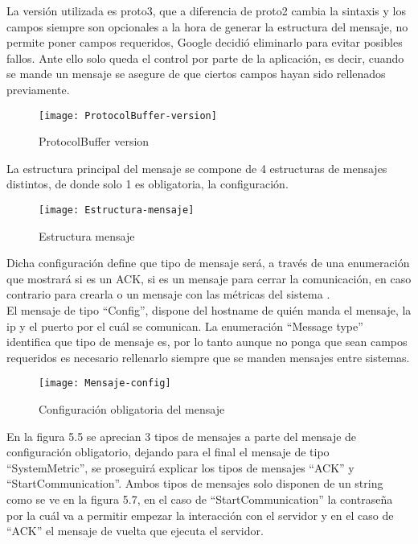 \documentclass[ spanish, a4paper, 12pt, oneside]{report}
\begin{document}
La versión utilizada es proto3, que a diferencia de proto2 cambia la sintaxis y los campos siempre son opcionales a la hora de generar la estructura del mensaje, no permite poner campos requeridos, Google decidió eliminarlo para 
evitar posibles fallos. Ante ello solo queda el control por parte de la aplicación, es decir, cuando se mande un mensaje se asegure de que ciertos campos hayan sido rellenados previamente. \\


\begin{figure}[!h]
   \centering
   \texttt{[image: ProtocolBuffer-version]}\\
      \caption{\label{fig: ProtocolBuffer version} ProtocolBuffer version}
\end{figure}

La estructura principal del mensaje se compone de 4 estructuras de mensajes distintos, de donde solo 1 es obligatoria, la configuración. \\

\begin{figure}[!h]
   \centering
   \texttt{[image: Estructura-mensaje]}\\
      \caption{\label{fig: Estructura mensaje} Estructura mensaje}
\end{figure}

Dicha configuración define que tipo de mensaje será, a través de una enumeración que mostrará si es un ACK, si es un mensaje para cerrar la comunicación, en caso contrario para crearla o un mensaje con las métricas del sistema . \\

El mensaje de tipo ``Config'', dispone del hostname de quién manda el mensaje, la ip y el puerto por el cuál se comunican. La enumeración ``Message type'' identifica que tipo de mensaje es, por lo tanto aunque no ponga 
que sean campos requeridos es necesario rellenarlo siempre que se manden mensajes entre sistemas. \\

\begin{figure}[!h]
   \centering
   \texttt{[image: Mensaje-config]}\\
      \caption{\label{fig: Configuración obligatoria del mensaje} Configuración obligatoria del mensaje}
\end{figure}

En la figura 5.5 se aprecian 3 tipos de mensajes a parte del mensaje de configuración obligatorio, dejando para el final el mensaje de tipo ``SystemMetric'', se proseguirá explicar los tipos de mensajes ``ACK'' y ``StartCommunication''. 
Ambos tipos de mensajes solo disponen de un string como se ve en la figura 5.7, en el caso de ``StartCommunication'' la contraseña por la cuál va a permitir empezar la interacción con el servidor y en el caso de ``ACK'' el mensaje 
de vuelta que ejecuta el servidor. \\
\end{document}
